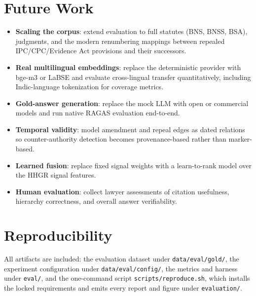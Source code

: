 \section{Future Work}

\begin{itemize}
  \item \textbf{Scaling the corpus}: extend evaluation to full statutes (BNS,
        BNSS, BSA), judgments, and the modern renumbering mappings between
        repealed IPC/CPC/Evidence Act provisions and their successors.
  \item \textbf{Real multilingual embeddings}: replace the deterministic
        provider with bge-m3 or LaBSE and evaluate cross-lingual transfer
        quantitatively, including Indic-language tokenization for coverage
        metrics.
  \item \textbf{Gold-answer generation}: replace the mock LLM with open or
        commercial models and run native RAGAS evaluation end-to-end.
  \item \textbf{Temporal validity}: model amendment and repeal edges as
        dated relations so counter-authority detection becomes provenance-based
        rather than marker-based.
  \item \textbf{Learned fusion}: replace fixed signal weights with a
        learn-to-rank model over the HHGR signal features.
  \item \textbf{Human evaluation}: collect lawyer assessments of citation
        usefulness, hierarchy correctness, and overall answer verifiability.
\end{itemize}

\section{Reproducibility}

All artifacts are included: the evaluation dataset under
\texttt{data/eval/gold/}, the experiment configuration under
\texttt{data/eval/config/}, the metrics and harness under \texttt{eval/}, and
the one-command script \texttt{scripts/reproduce.sh}, which installs the locked
requirements and emits every report and figure under \texttt{evaluation/}.
